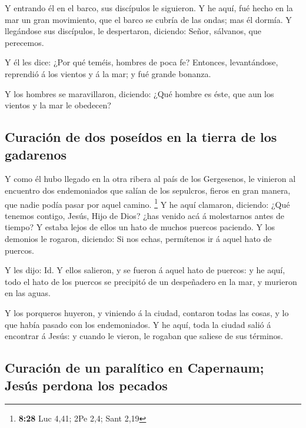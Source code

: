  Y entrando él en el barco, sus discípulos le siguieron.
 Y he aquí, fué hecho en la mar un gran movimiento, que
el barco se cubría de las ondas; mas él dormía.  Y
llegándose sus discípulos, le despertaron, diciendo: Señor, sálvanos,
que perecemos.

 Y él les dice: ¿Por qué teméis, hombres de poca fe?
Entonces, levantándose, reprendió á los vientos y á la mar; y fué grande
bonanza.

 Y los hombres se maravillaron, diciendo: ¿Qué hombre es
éste, que aun los vientos y la mar le obedecen?

\hypertarget{curaciuxf3n-de-dos-poseuxeddos-en-la-tierra-de-los-gadarenos}{%
\subsection{Curación de dos poseídos en la tierra de los
gadarenos}\label{curaciuxf3n-de-dos-poseuxeddos-en-la-tierra-de-los-gadarenos}}

 Y como él hubo llegado en la otra ribera al país de los
Gergesenos, le vinieron al encuentro dos endemoniados que salían de los
sepulcros, fieros en gran manera, que nadie podía pasar por aquel
camino. \footnote{\textbf{8:28} Luc 4,41; 2Pe 2,4; Sant 2,19}
 Y he aquí clamaron, diciendo: ¿Qué tenemos contigo,
Jesús, Hijo de Dios? ¿has venido acá á molestarnos antes de tiempo?
 Y estaba lejos de ellos un hato de muchos puercos
paciendo.  Y los demonios le rogaron, diciendo: Si nos
echas, permítenos ir á aquel hato de puercos.

 Y les dijo: Id. Y ellos salieron, y se fueron á aquel
hato de puercos: y he aquí, todo el hato de los puercos se precipitó de
un despeñadero en la mar, y murieron en las aguas.

 Y los porqueros huyeron, y viniendo á la ciudad,
contaron todas las cosas, y lo que había pasado con los endemoniados.
 Y he aquí, toda la ciudad salió á encontrar á Jesús: y
cuando le vieron, le rogaban que saliese de sus términos.

\hypertarget{curaciuxf3n-de-un-paraluxedtico-en-capernaum-jesuxfas-perdona-los-pecados}{%
\subsection{Curación de un paralítico en Capernaum; Jesús perdona los
pecados}\label{curaciuxf3n-de-un-paraluxedtico-en-capernaum-jesuxfas-perdona-los-pecados}}

